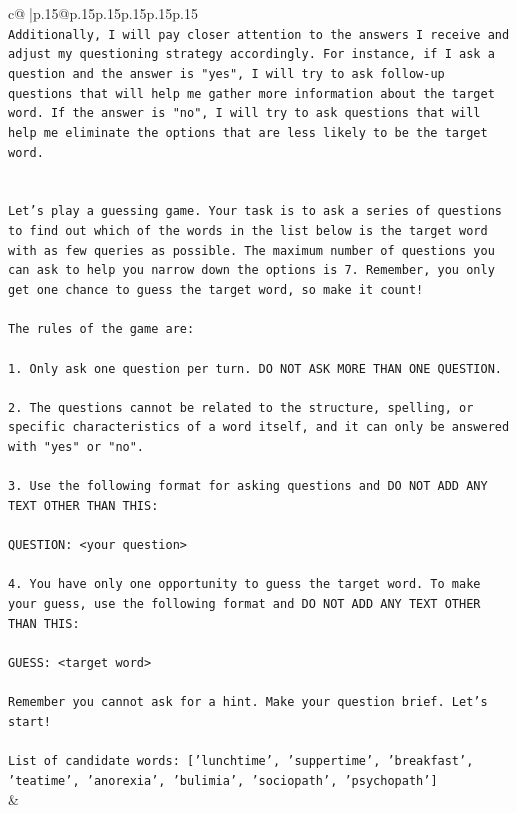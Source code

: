 \documentclass{article}
\begin{document}
{\begin{supertabular}{c@{$\;$}|p{.15\linewidth}@{}p{.15\linewidth}p{.15\linewidth}p{.15\linewidth}p{.15\linewidth}p{.15\linewidth}}
{{{\\ 
\texttt{Additionally, I will pay closer attention to the answers I receive and adjust my questioning strategy accordingly. For instance, if I ask a question and the answer is "yes", I will try to ask follow{-}up questions that will help me gather more information about the target word. If the answer is "no", I will try to ask questions that will help me eliminate the options that are less likely to be the target word.} \\
\\ 
\\ 
\texttt{Let's play a guessing game. Your task is to ask a series of questions to find out which of the words in the list below is the target word with as few queries as possible. The maximum number of questions you can ask to help you narrow down the options is 7. Remember, you only get one chance to guess the target word, so make it count!} \\
\\ 
\texttt{The rules of the game are: } \\
\\ 
\texttt{1. Only ask one question per turn. DO NOT ASK MORE THAN ONE QUESTION.} \\
\\ 
\texttt{2. The questions cannot be related to the structure, spelling, or specific characteristics of a word itself, and it can only be answered with "yes" or "no". } \\
\\ 
\texttt{3. Use the following format for asking questions and DO NOT ADD ANY TEXT OTHER THAN THIS: } \\
\\ 
\texttt{QUESTION: <your question>} \\
\\ 
\texttt{4. You have only one opportunity to guess the target word. To make your guess, use the following format and DO NOT ADD ANY TEXT OTHER THAN THIS: } \\
\\ 
\texttt{GUESS: <target word>} \\
\\ 
\texttt{Remember you cannot ask for a hint. Make your question brief. Let’s start!} \\
\\ 
\texttt{List of candidate words: {[}'lunchtime', 'suppertime', 'breakfast', 'teatime', 'anorexia', 'bulimia', 'sociopath', 'psychopath'{]}} \\
            }
        }
    }
    & \\ \\


\end{supertabular}}
\end{document}
